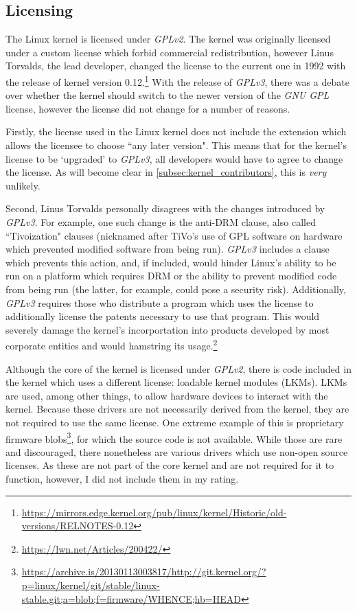 \documentclass[11pt]{article}
\begin{document}
\subsection{Licensing}
\label{subsec:kernel_license}

The Linux kernel is licensed under \textit{GPLv2}.  The kernel was originally licensed under a custom license which forbid commercial redistribution, however Linus Torvalds, the lead developer, changed the license to the current one in 1992 with the release of kernel version 0.12.\footnote{\url{https://mirrors.edge.kernel.org/pub/linux/kernel/Historic/old-versions/RELNOTES-0.12}}  With the release of \textit{GPLv3}, there was a debate over whether the kernel should switch to the newer version of the \textit{GNU GPL} license, however the license did not change for a number of reasons.

Firstly, the license used in the Linux kernel does not include the extension which allows the licensee to choose ``any later version".  This means that for the kernel's license to be `upgraded' to \textit{GPLv3}, all developers would have to agree to change the license.  As will become clear in \ref{subsec:kernel_contributors}, this is \textit{very} unlikely.

Second, Linus Torvalds personally disagrees with the changes introduced by \textit{GPLv3}.  For example, one such change is the anti-DRM clause, also called ``Tivoization" clauses (nicknamed after TiVo's use of GPL software on hardware which prevented modified software from being run).  \textit{GPLv3} includes a clause which prevents this action, and, if included, would hinder Linux's ability to be run on a platform which requires DRM or the ability to prevent modified code from being run (the latter, for example, could pose a security risk).  Additionally, \textit{GPLv3} requires those who distribute a program which uses the license to additionally license the patents necessary to use that program.  This would severely damage the kernel's incorportation into products developed by most corporate entities and would hamstring its usage.\footnote{\url{https://lwn.net/Articles/200422/}}

Although the core of the kernel is licensed under \textit{GPLv2}, there is code included in the kernel which uses a different license: loadable kernel modules (LKMs).  LKMs are used, among other things, to allow hardware devices to interact with the kernel.  Because these drivers are not necessarily derived from the kernel, they are not required to use the same license.  One extreme example of this is proprietary firmware blobs\footnote{\url{https://archive.is/20130113003817/http://git.kernel.org/?p=linux/kernel/git/stable/linux-stable.git;a=blob;f=firmware/WHENCE;hb=HEAD}}, for which the source code is not available.  While those are rare and discouraged, there nonetheless are various drivers which use non-open source licenses.  As these are not part of the core kernel and are not required for it to function, however, I did not include them in my rating.
\end{document}

